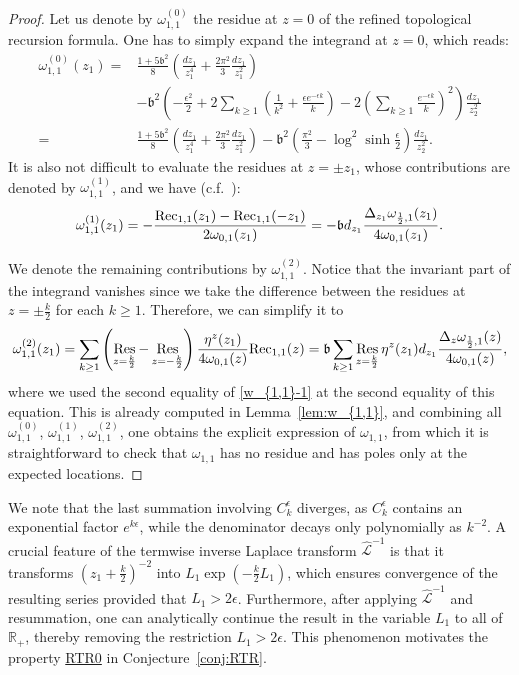\documentclass[12pt]{amsart}
\DeclareMathOperator*{\Res}{Res}
\theoremstyle{plain}
\theoremstyle{definition}
\theoremstyle{remark}
\numberwithin{equation}{section}
\begin{document}
\begin{proof}
Let us denote by $\omega_{1,1}^{(0)}$ the residue at $z=0$ of the refined topological recursion formula. One has to simply expand the integrand at $z=0$, which reads: 
\begin{align*}
\omega_{1,1}^{(0)}(z_1)=&\frac{1+5\mathfrak{b}^2}{8}\left(\frac{dz_1}{z_1^4}+\frac{2\pi^2}{3}\frac{dz_1}{z_1^2}\right)\nonumber\\
&-\mathfrak{b}^2\left(-\frac{\epsilon^2}{2}+2\sum_{k\geq1}\left(\frac{1}{k^2}+\frac{\epsilon e^{-\epsilon k}}{k}\right)-2\left(\sum_{k\geq1}\frac{e^{-\epsilon k}}{k}\right)^2\right)\frac{dz_1}{z_2^2}\nonumber\\
=&\frac{1+5\mathfrak{b}^2}{8}\left(\frac{dz_1}{z_1^4}+\frac{2\pi^2}{3}\frac{dz_1}{z_1^2}\right)-\mathfrak{b}^2\left(\frac{\pi^2}{3}-\log^2\sinh\frac{\epsilon}{2}\right)\frac{dz_1}{z_2^2}.
\end{align*}
It is also not difficult to evaluate the residues at $z=\pm z_1$, whose contributions are denoted by $\omega_{1,1}^{(1)}$, and we have (c.f.~\cite[Lemma 3.11]{Osu23-1}):
\begin{equation}
\omega_{1,1}^{(1)}(z_1)=-\frac{{\rm Rec}_{1,1}(z_1)-{\rm Rec}_{1,1}(-z_1)}{2\omega_{0,1}(z_1)}=-\mathfrak{b}d_{z_1}\frac{\Delta_{z_1}\omega_{\frac12,1}(z_1)}{4\omega_{0,1}(z_1)}.\label{w_{1,1}-1}
\end{equation}

We denote the remaining contributions by $\omega_{1,1}^{(2)}$. Notice that the invariant part of the integrand vanishes since we take the difference between the residues at $z=\pm\frac{k}{2}$ for each $k\geq1$. Therefore, we can simplify it to
\begin{equation*}
\omega_{1,1}^{(2)}(z_1)=\sum_{k\geq1}\left(\Res_{z=\frac{k}{2}}-\Res_{z=-\frac{k}{2}}\right)\frac{\eta^z(z_1)}{4\omega_{0,1}(z)}{\rm Rec}_{1,1}(z)=\mathfrak{b}\sum_{k\geq1}\Res_{z=\frac{k}{2}}\eta^z(z_1)d_{z_1}\frac{\Delta_{z}\omega_{\frac12,1}(z)}{4\omega_{0,1}(z)},
\end{equation*}
where we used the second equality of \eqref{w_{1,1}-1} at the second equality of this equation. This is already computed in Lemma~\ref{lem:w_{1,1}}, and combining all $\omega_{1,1}^{(0)}$, $\omega_{1,1}^{(1)}$, $\omega_{1,1}^{(2)}$, one obtains the explicit expression of $\omega_{1,1}$, from which it is straightforward to check that $\omega_{1,1}$ has no residue and has poles only at the expected locations.
\end{proof}

We note that the last summation involving $C_k^\epsilon$ diverges, as $C_k^\epsilon$ contains an exponential factor $e^{k\epsilon}$, while the denominator decays only polynomially as $k^{-2}$. A crucial feature of the termwise inverse Laplace transform $\hat{\mathcal{L}}^{-1}$ is that it transforms $(z_1+\frac{k}{2})^{-2}$ into $L_1 \exp(-\frac{k}{2}L_1)$, which ensures convergence of the resulting series provided that $L_1>2\epsilon$. Furthermore, after applying $\hat{\mathcal{L}}^{-1}$ and resummation, one can analytically continue the result in the variable $L_1$ to all of $\mathbb{R}_+$, thereby removing the restriction $L_1>2\epsilon$. This phenomenon motivates the property \hyperref[item:RTR0]{RTR0} in Conjecture~\ref{conj:RTR}.
\end{document}
